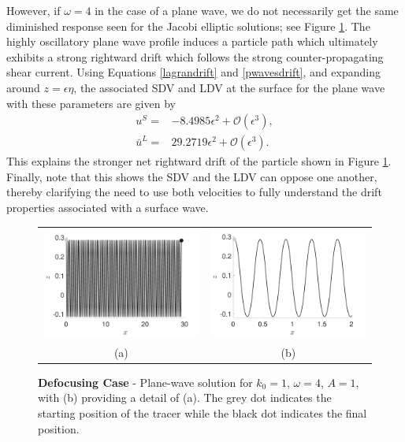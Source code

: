 \documentclass{JFM_Style/jfm}
\begin{document}
However, if $\omega=4$ in the case of a plane wave, we do not necessarily get the same diminished response seen for the Jacobi elliptic solutions; see Figure \ref{fig:defoc_pwave}.  The highly oscillatory plane wave profile induces a particle path which ultimately exhibits a strong rightward drift which follows the strong counter-propagating shear current.   Using Equations \eqref{lagrandrift} and \eqref{pwavesdrift}, and expanding around $z=\epsilon \eta$, the associated SDV and LDV at the surface for the plane wave with these parameters are given by 
\begin{align*}
u^{S} = & -8.4985\epsilon^{2} + \mathcal{O}(\epsilon^{3}),\\
\bar{u}^{L} = & 29.2719\epsilon^{2} + \mathcal{O}(\epsilon^{3}).
\end{align*}
This explains the stronger net rightward drift of the particle shown in Figure \ref{fig:defoc_pwave}.  Finally, note that this shows the SDV and the LDV can oppose one another, thereby clarifying the need to use both velocities to fully understand the drift properties associated with a surface wave.  
 \begin{figure}
\centering
\begin{tabular}{cc}
\includegraphics[width=.5\textwidth]{om_val_4_k0_1_ep_pt1_defoc_ztrack_pwave} & \includegraphics[width=.5\textwidth]{om_val_4_k0_1_ep_pt1_defoc_ztrack_pwave_detail}\\
(a) & (b)
\end{tabular}
\caption{\small {\bf Defocusing Case} - Plane-wave solution for $k_{0}=1$, $\omega=4$, $A=1$, with (b) providing a detail of (a).  The grey dot indicates the starting position of the tracer while the black dot indicates the final position.}
\label{fig:defoc_pwave}
\end{figure}
\end{document}

